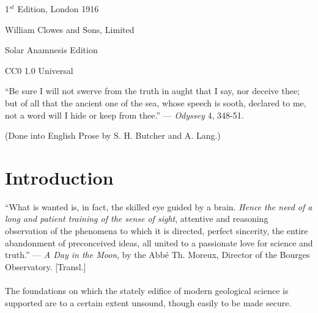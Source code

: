\documentclass[a4paper, 12pt, oneside, landscape]{article}
\begin{document}
\begin{titlepage}
		
	\vspace*{\fill}%
	
	1$^{st}$ Edition, London 1916 %
	
	{\tiny William Clowes and Sons, Limited } %

	\vspace{0.1\baselineskip} %

    {\tiny Solar Anamnesis Edition} %
	
	{\tiny CC0 1.0 Universal } %
\end{titlepage}
\scriptsize
\setlength{\parskip}{1mm plus1mm minus1mm}
\setcounter{tocdepth}{3}
\setcounter{secnumdepth}{3}
\tableofcontents
\clearpage
\listoffigures{}
\clearpage
\vspace*{\fill}
\begin{displayquote}
``Be sure I will not swerve from the truth in aught that I say, nor deceive thee; but of all that the ancient one of the sea, whose speech is sooth, declared to me, not a word will I hide or keep from thee.'' --- \emph{Odyssey} 4, 348-51.

(Done into English Prose by S. H. Butcher and A. Lang.)
\end{displayquote}
\vspace*{\fill}
\clearpage
\section*{Introduction}
\begin{displayquote}
``What is wanted is, in fact, the skilled eye guided by a brain. \emph{Hence the need of a long and patient training of the sense of sight}, attentive and reasoning observation of the phenomena to which it is directed, perfect sincerity, the entire abandonment of preconceived ideas, all united to a passionate love for science and truth.'' --- \emph{A Day in the Moon}, by the Abbé Th. Moreux, Director of the Bourges Observatory. [Transl.]
\end{displayquote}
\paragraph{}
The foundations on which the stately edifice of modern geological science is supported are to a certain extent unsound, though easily to be made secure.
\end{document}
